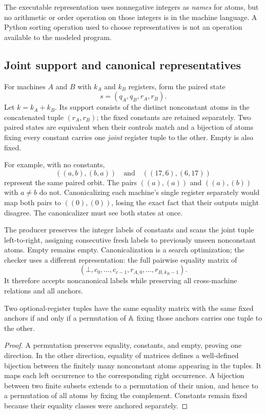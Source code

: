 The executable representation uses nonnegative integers as \emph{names} for
atoms, but no arithmetic or order operation on those integers is in the machine
language. A Python sorting operation used to choose representatives is not an
operation available to the modeled program.

\subsection{Joint support and canonical representatives}
For machines $A$ and $B$ with $k_A$ and $k_B$ registers, form the paired state
\[
 s=(q_A,q_B,r_A,r_B).
\]
Let $k=k_A+k_B$. Its support consists of the distinct nonconstant atoms in the
concatenated tuple $(r_A,r_B)$; the fixed constants are retained separately.
Two paired states are equivalent when their controls match and a bijection of
atoms fixing every constant carries one \emph{joint} register tuple to the
other. Empty is also fixed.

For example, with no constants,
\[
 ((a,b),(b,a))\quad\text{and}\quad((17,6),(6,17))
\]
represent the same paired orbit. The pairs $((a),(a))$ and $((a),(b))$ with
$a\ne b$ do not. Canonicalizing each machine's single register separately
would map both pairs to $((0),(0))$, losing the exact fact that their outputs
might disagree. The canonicalizer must see both states at once.

The producer preserves the integer labels of constants and scans the joint
tuple left-to-right, assigning consecutive fresh labels to previously unseen
nonconstant atoms. Empty remains empty. Canonicalization is a search
optimization; the checker uses a different representation: the full pairwise
equality matrix of
\[
 (\bot,c_0,\ldots,c_{c-1},r_{A,0},\ldots,r_{B,k_B-1}).
\]
It therefore accepts noncanonical labels while preserving all cross-machine
relations and all anchors.

\begin{lemma}
\label{lem:pattern}
Two optional-register tuples have the same equality matrix with the same fixed
anchors if and only if a permutation of $\mathbb A$ fixing those anchors carries
one tuple to the other.
\end{lemma}
\begin{proof}
A permutation preserves equality, constants, and empty, proving one direction.
In the other direction, equality of matrices defines a well-defined bijection
between the finitely many nonconstant atoms appearing in the tuples. It maps
each left occurrence to the corresponding right occurrence. A bijection between
two finite subsets extends to a permutation of their union, and hence to a
permutation of all atoms by fixing the complement. Constants remain fixed
because their equality classes were anchored separately.
\end{proof}

